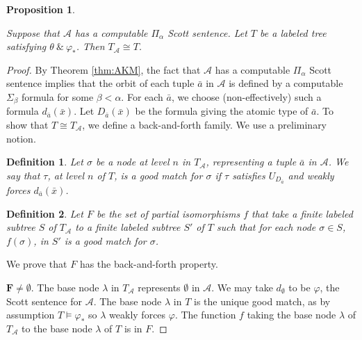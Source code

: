 \documentclass{article}
\newtheorem{prop}[thm]{Proposition}
\newtheorem{defn}{Definition}
\begin{document}
\begin{prop}\label{prop:finishing}

Suppose that $\mathcal{A}$ has a computable $\Pi_\alpha$ Scott sentence.  Let $T$ be a labeled tree satisfying $\theta\ \&\ \varphi_*$.  Then $T_\mathcal{A}\cong T$.

\end{prop} 

\begin{proof}

By Theorem \ref{thm:AKM}, the fact that $\mathcal{A}$ has a computable $\Pi_\alpha$ Scott sentence implies that the orbit of each tuple $\bar{a}$ in $\mathcal{A}$ is defined by a computable $\Sigma_\beta$ formula for some $\beta < \alpha$.  For each $\bar{a}$, we choose (non-effectively) such a formula $d_{\bar{a}}(\bar{x})$.  Let $D_{\bar{a}}(\bar{x})$ be the formula giving the atomic type of $\bar{a}$.  To show that $T\cong T_\mathcal{A}$, we define a back-and-forth family.  We use a preliminary notion. 

\begin{defn}  

Let $\sigma$ be a node at level $n$ in $T_\mathcal{A}$, representing a tuple $\bar{a}$ in $\mathcal{A}$.  We say that $\tau$, at level $n$ of $T$, is a \emph{good match for $\sigma$} if $\tau$ 
satisfies $U_{D_{\bar{a}}}$ and weakly forces $d_{\bar{a}}(\bar{x})$. 

\end{defn} 

\begin{defn}

Let $F$ be the set of partial isomorphisms $f$ that take a finite labeled subtree $S$ of $T_\mathcal{A}$ to a finite labeled subtree $S'$ of $T$ such that for each node $\sigma\in S$, $f(\sigma)$, in $S'$ is a good match for $\sigma$.  

\end{defn}

We prove that $F$ has the back-and-forth property.   

\medskip
\noindent
\textbf{$\mathbf{F\not=\emptyset}$}.  The base node $\lambda$ in $T_\mathcal{A}$ represents $\emptyset$ in $\mathcal{A}$.  We may take $d_\emptyset$ to be $\varphi$, the Scott sentence for $\mathcal{A}$.  The base node $\lambda$ in $T$ is the unique good match, as by assumption $T\models\varphi_*$ so $\lambda$ weakly forces $\varphi$.  The function $f$ taking the base node $\lambda$ of $T_\mathcal{A}$ to the base node $\lambda$ of $T$ is in $F$.    


\end{proof}
\end{document}
